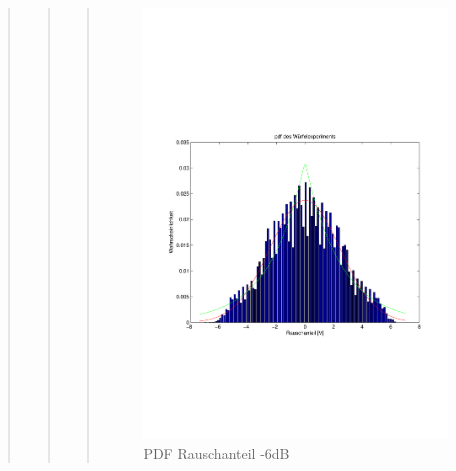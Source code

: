 \begin{quote}
\begin{quote}
\begin{quote}
        \begin{figure}[H]
        \centering
            \includegraphics[scale=0.6, trim = 1cm 6.5cm 1cm 7.5cm, clip]{./Bilder/PDFRauschen-6dB}
                \caption{PDF Rauschanteil -6dB}
        \end{figure}
        

\end{quote}
\end{quote}
\end{quote}
